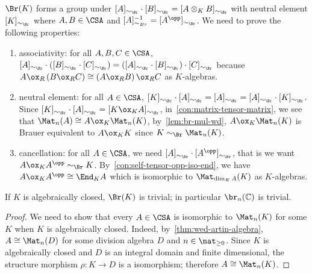 \begin{construction}\label{con:br}
  $\Br(K)$ forms a group under $[A]_{\sim_{\Br}}\cdot[B]_{\sim_{\Br}}=[A\otimes_{K}B]_{\sim_{\Br}}$ with neutral element $[K]_{\sim_{\Br}}$ where $A, B\in\CSA$ and $[A]_{\sim_{Br}}^{-1}=[A^{\opp}]_{\sim_{\Br}}$. We need to prove the following properties:
  \begin{enumerate}
    \item associativity: for all $A, B, C\in\CSA$, $[A]_{\sim_{\Br}}\cdot\left([B]_{\sim_{\Br}}\cdot[C]_{\sim_{\Br}}\right)=\left([A]_{\sim_{\Br}}\cdot[B]_{\sim_{\Br}}\right)\cdot [C]_{\sim_{\Br}}$ because $A\ox_{R}\left(B\ox_{R}C\right)\cong \left(A\ox_{R}B\right)\ox_{R}C$ as $K$-algebras.
    \item neutral element: for all $A\in \CSA$, $[K]_{\sim_{\Br}}\cdot[A]_{\sim_{\Br}}=[A]_{\sim_{\Br}}=[A]_{\sim_{\Br}}\cdot [K]_{\sim_{\Br}}$. Since $[K]_{\sim_{\Br}}\cdot[A]_{\sim_{\Br}}=[K\ox_{K} A]_{\sim_{\Br}}$, in~\cref{con:matrix-tensor-matrix}, we see that $\Mat_{n}(A)\cong A\ox_{K}\Mat_{n}(K)$, by~\cref{lem:br-mul-wd}, $A\ox_{K}\Mat_{n}(K)$ is Brauer equivalent to $A\ox_{K} K$ since $K\sim_{\Br}\Mat_{n}(K)$.
    \item cancellation: for all $A \in \CSA$, we need $[A]_{\sim_{\Br}}\cdot[A^{\opp}]_{\sim_{\Br}}$, that is we want $A\ox_{K}A^{\opp}\sim_{\Br} K$. By~\cref{con:self-tensor-opp-iso-end}, we have $A\ox_{K}A^{\opp}\cong \End_{K}A$ which is isomorphic to $\Mat_{\dim_{K}A}(K)$ as $K$-algebras.
  \end{enumerate}
  \leanok
\end{construction}

\begin{theorem}
  \label{thm:br-triv-alg-closed}
  If $K$ is algebraically closed, $\Br(K)$ is trivial; in particular $\br_{n}(\mathbb{C})$ is trivial.
  \leanok
\end{theorem}
\begin{proof}
  We need to show that every $A\in\CSA$ is isomorphic to $\Mat_{n}(K)$ for some $K$ when $K$ is algebraically closed. Indeed, by~\cref{thm:wed-artin-algebra}, $A \cong \Mat_{n}(D)$ for some division algebra $D$ and $n\in\nat_{\ge0}$. Since $K$ is algebraically closed and $D$ is an integral domain and finite dimensional, the structure morphism $\rho: K\to D$ is a isomorphism; therefore $A\cong \Mat_{n}(K)$.
\end{proof}

